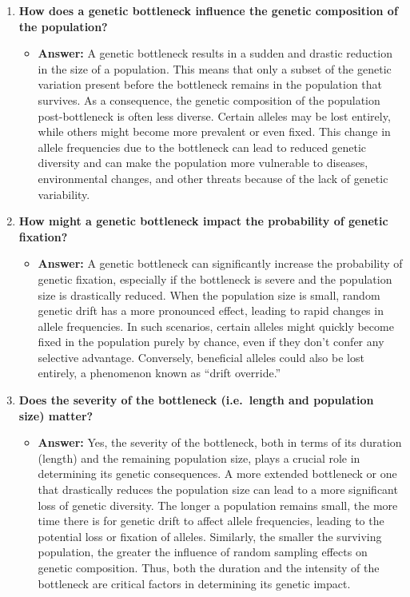 \documentclass[
  a4paper]{book}
\providecommand{\tightlist}{%
  \setlength{\itemsep}{0pt}\setlength{\parskip}{0pt}}
\begin{document}
\begin{enumerate}
\def\labelenumi{\arabic{enumi}.}
\tightlist
\item
  \textbf{How does a genetic bottleneck influence the genetic composition of the population?}

  \begin{itemize}
  \tightlist
  \item
    \textbf{Answer:} A genetic bottleneck results in a sudden and drastic reduction in the size of a population. This means that only a subset of the genetic variation present before the bottleneck remains in the population that survives. As a consequence, the genetic composition of the population post-bottleneck is often less diverse. Certain alleles may be lost entirely, while others might become more prevalent or even fixed. This change in allele frequencies due to the bottleneck can lead to reduced genetic diversity and can make the population more vulnerable to diseases, environmental changes, and other threats because of the lack of genetic variability.
  \end{itemize}
\item
  \textbf{How might a genetic bottleneck impact the probability of genetic fixation?}

  \begin{itemize}
  \tightlist
  \item
    \textbf{Answer:} A genetic bottleneck can significantly increase the probability of genetic fixation, especially if the bottleneck is severe and the population size is drastically reduced. When the population size is small, random genetic drift has a more pronounced effect, leading to rapid changes in allele frequencies. In such scenarios, certain alleles might quickly become fixed in the population purely by chance, even if they don't confer any selective advantage. Conversely, beneficial alleles could also be lost entirely, a phenomenon known as ``drift override.''
  \end{itemize}
\item
  \textbf{Does the severity of the bottleneck (i.e.~length and population size) matter?}

  \begin{itemize}
  \tightlist
  \item
    \textbf{Answer:} Yes, the severity of the bottleneck, both in terms of its duration (length) and the remaining population size, plays a crucial role in determining its genetic consequences. A more extended bottleneck or one that drastically reduces the population size can lead to a more significant loss of genetic diversity. The longer a population remains small, the more time there is for genetic drift to affect allele frequencies, leading to the potential loss or fixation of alleles. Similarly, the smaller the surviving population, the greater the influence of random sampling effects on genetic composition. Thus, both the duration and the intensity of the bottleneck are critical factors in determining its genetic impact.
  \end{itemize}
\end{enumerate}
\end{document}
